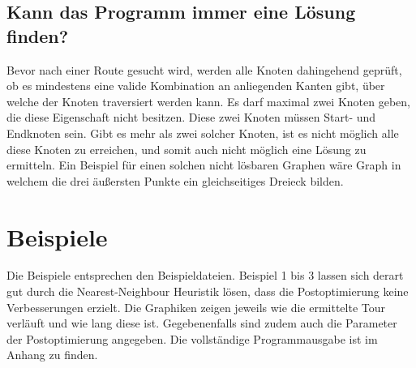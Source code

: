 \subsection{Kann das Programm immer eine Lösung finden?}\label{subsec:losbarkeit}
Bevor nach einer Route gesucht wird, werden alle Knoten dahingehend geprüft, ob es mindestens eine valide Kombination
an anliegenden Kanten gibt, über welche der Knoten traversiert werden kann.
Es darf maximal zwei Knoten geben, die diese Eigenschaft nicht besitzen.
Diese zwei Knoten müssen Start- und Endknoten sein.
Gibt es mehr als zwei solcher Knoten, ist es nicht möglich alle diese Knoten zu erreichen, und somit auch nicht möglich
eine Lösung zu ermitteln.
Ein Beispiel für einen solchen nicht lösbaren Graphen wäre Graph in welchem
die drei äu{\ss}ersten Punkte ein gleichseitiges Dreieck bilden.


\section{Beispiele}\label{sec:beispiele}
Die Beispiele entsprechen den Beispieldateien.
Beispiel 1 bis 3 lassen sich derart gut durch die Nearest-Neighbour Heuristik lösen, dass die Postoptimierung keine Verbesserungen erzielt.
Die Graphiken zeigen jeweils wie die ermittelte Tour verläuft und wie lang diese ist.
Gegebenenfalls sind zudem auch die Parameter der Postoptimierung angegeben.
Die vollständige Programmausgabe ist im Anhang zu finden.

